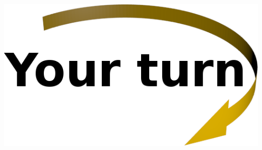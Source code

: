\documentclass[svgnames]{beamer}
\begin{document}
\begin{frame}
 \begin{center}

  \vspace{0.5truecm}
  \includegraphics[width=3truecm]{yourturn}
 \end{center}
\end{frame}
\end{document}
